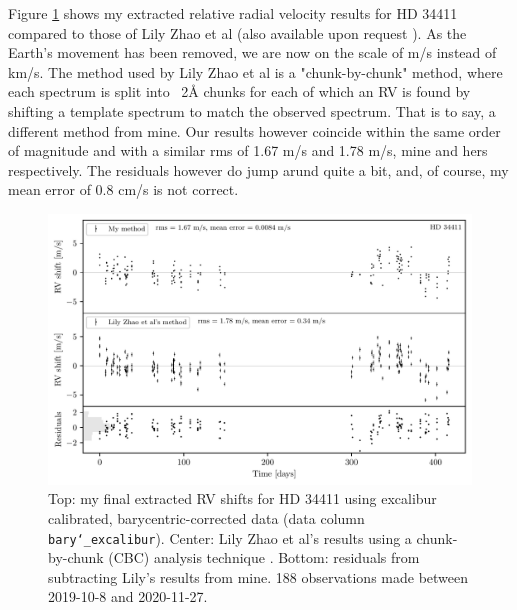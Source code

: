 

Figure \ref{fig:HD34411_rvs} shows my extracted relative radial velocity results for HD 34411 compared to those of Lily Zhao et al (also available upon request \cite{yale_data}). As the Earth's movement has been removed, we are now on the scale of m/s instead of km/s. The method used by Lily Zhao et al is a "chunk-by-chunk" method, where each spectrum is split into ~2Å chunks for each of which an RV is found by shifting a template spectrum to match the observed spectrum. That is to say, a different method from mine. Our results however coincide within the same order of magnitude and with a similar rms of 1.67 m/s and 1.78 m/s, mine and hers respectively. The residuals however do jump arund quite a bit, and, of course, my mean error of 0.8 cm/s is not correct.

\begin{figure}%
    \begin{wide}  
        \includegraphics[width=\textwidth]{figures/HD34411_barycentric_rv_vs_lily.pdf}
        \caption{Top: my final extracted RV shifts for HD 34411 using excalibur calibrated, barycentric-corrected data (data column \texttt{bary\char`_excalibur}). Center: Lily Zhao et al's results using a chunk-by-chunk (CBC) analysis technique \cite{yale_data}. Bottom: residuals from subtracting Lily's results from mine. 188 observations made between 2019-10-8 and 2020-11-27.}
        \label{fig:HD34411_rvs}
    \end{wide}
\end{figure}

